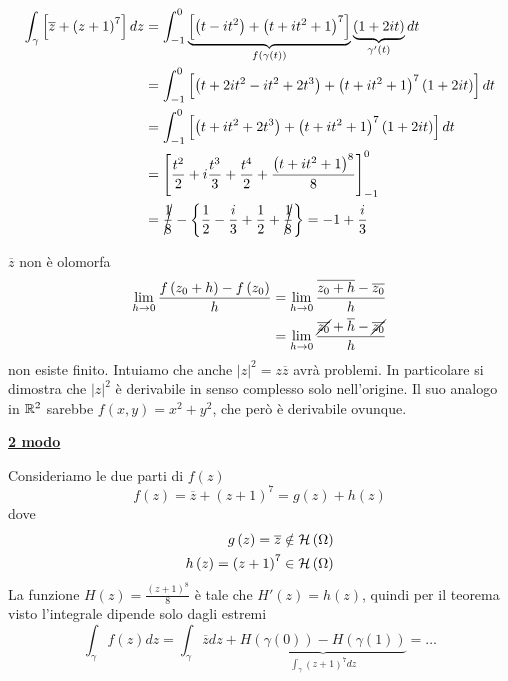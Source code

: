 \begin{align*}
\int\nolimits _{\gamma }\left[\overline{z} +\left( z+1\right)^{7}\right] dz & =\int\nolimits ^{0}_{-1}\underbrace{\left[\left( t-it^{2}\right) +\left( t+it^{2} +1\right)^{7}\right]}_{f\left( \gamma \left( t\right)\right)}\underbrace{\left( 1+2it\right)}_{\gamma '\left( t\right)} dt\\
 & =\int\nolimits ^{0}_{-1}\left[\left( t+2it^{2} -it^{2} +2t^{3}\right) +\left( t+it^{2} +1\right)^{7}\left( 1+2it\right)\right] dt\\
 & =\int\nolimits ^{0}_{-1}\left[\left( t+it^{2} +2t^{3}\right) +\left( t+it^{2} +1\right)^{7}\left( 1+2it\right)\right] dt\\
 & =\left[\frac{t^{2}}{2} +i\frac{t^{3}}{3} +\frac{t^{4}}{2} +\frac{\left( t+it^{2} +1\right)^{8}}{8}\right]^{0}_{-1}\\
 & =\cancel{\frac{1}{8}} -\left\{\frac{1}{2} -\frac{i}{3} +\frac{1}{2} +\cancel{\frac{1}{8}}\right\} =-1+\frac{i}{3}
\end{align*}
\begin{rem}
$\overline{z}$ non è olomorfa
\begin{align*}
\lim\limits _{h\rightarrow 0}\frac{f\left( z_{0} +h\right) -f\left( z_{0}\right)}{h} & =\lim\limits _{h\rightarrow 0}\frac{\overline{z_{0} +h} -\overline{z_{0}}}{h}\\
 & =\lim\limits _{h\rightarrow 0}\frac{\cancel{\overline{z_{0}}} +\overline{h} -\cancel{\overline{z_{0}}}}{h}
\end{align*}
non esiste finito. Intuiamo che anche $\left| z\right| ^{2} =z\overline{z}$ avrà problemi. In particolare si dimostra che $\left| z\right| ^{2}$ è derivabile in senso complesso solo nell'origine. Il suo analogo in $\mathbb{R} ^{2}$ sarebbe $f\left( x,y\right) =x^{2} +y^{2}$, che però è derivabile ovunque.
\end{rem}
\textbf{\underline{2 modo}}

Consideriamo le due parti di $f\left( z\right)$
\begin{equation*}
f\left( z\right) =\overline{z} +\left( z+1\right)^{7} =g\left( z\right) +h\left( z\right)
\end{equation*}
dove
\begin{equation*}
\begin{aligned}
g\left( z\right) =\overline{z} & \notin \mathcal{H} \left( \Omega \right)\\
h\left( z\right) =\left( z+1\right)^{7} & \in \mathcal{H} \left( \Omega \right)
\end{aligned}
\end{equation*}
La funzione $H\left( z\right) =\frac{\left( z+1\right)^{8}}{8}$ è tale che $H'\left( z\right) =h\left( z\right)$, quindi per il teorema visto l'integrale dipende solo dagli estremi
\begin{equation*}
\int\nolimits _{\gamma } f\left( z\right) dz=\int\nolimits _{\gamma }\overline{z} dz+\underbrace{H\left( \gamma \left( 0\right)\right) -H\left( \gamma \left( 1\right)\right)}_{\int\nolimits _{\gamma }\left( z+1\right)^{7} dz} =\dotsc 
\end{equation*}
\Soluzione

